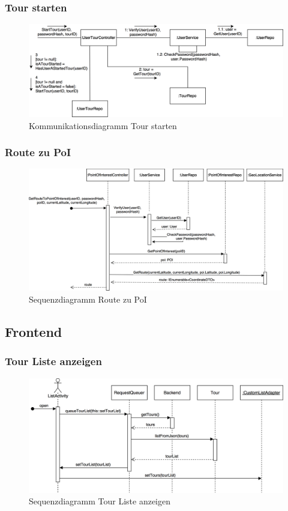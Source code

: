 \documentclass[a4paper,10pt,xetex]{article}
\begin{document}
\subsubsection{Tour starten}
\begin{figure}
  \includegraphics{Kommunikationsdiagramm_StartTour}
  \caption{Kommunikationsdiagramm Tour starten}
\end{figure}

\subsubsection{Route zu PoI}
\begin{figure}
  \includegraphics{Sequenzdiagramm_GetRouteToPoi}
  \caption{Sequenzdiagramm Route zu PoI}
\end{figure}

\subsection{Frontend}\label{frontend}
\subsubsection{Tour Liste anzeigen}
\begin{figure}
  \includegraphics{Sequenzdiagramm_ListActivity}
  \caption{Sequenzdiagramm Tour Liste anzeigen}
\end{figure}
\end{document}
